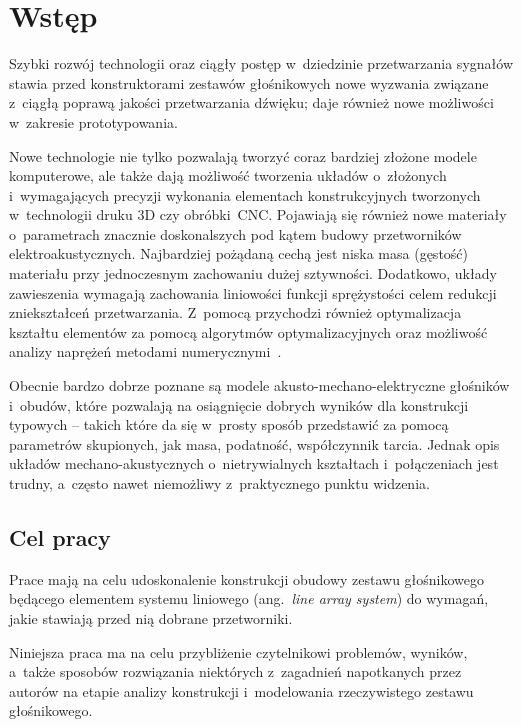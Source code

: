 \documentclass[12pt]{oska}
\affiliation{Akademia Górniczo-Hutnicza im. S. Staszica w Krakowie}
\begin{document}
	
	\maketitles
	
	\section{Wstęp}
	
	Szybki rozwój technologii oraz ciągły postęp w~dziedzinie przetwarzania sygnałów stawia przed konstruktorami zestawów głośnikowych nowe wyzwania związane z~ciągłą poprawą jakości przetwarzania dźwięku; daje również nowe możliwości w~zakresie prototypowania. 
	
	Nowe technologie nie tylko pozwalają tworzyć coraz bardziej złożone modele komputerowe, ale także dają możliwość tworzenia układów o~złożonych i~wymagających precyzji wykonania elementach konstrukcyjnych tworzonych w~technologii druku 3D czy obróbki~CNC. Pojawiają się również nowe materiały o~parametrach znacznie doskonalszych pod kątem budowy przetworników elektroakustycznych. Najbardziej pożądaną cechą jest niska masa (gęstość) materiału przy jednoczesnym zachowaniu dużej sztywności. Dodatkowo, układy zawieszenia wymagają zachowania liniowości funkcji sprężystości celem redukcji zniekształceń przetwarzania. Z~pomocą przychodzi również optymalizacja kształtu elementów za pomocą algorytmów optymalizacyjnych oraz możliwość analizy naprężeń metodami numerycznymi~\cite{naprezenia}.
	
	Obecnie bardzo dobrze poznane są modele akusto-mechano-elektryczne głośników i~obudów, które pozwalają na osiągnięcie dobrych wyników dla konstrukcji typowych -- takich które da się w~prosty sposób przedstawić za pomocą parametrów skupionych, jak masa, podatność, współczynnik tarcia. Jednak opis układów mechano-akustycznych o~nietrywialnych kształtach i~połączeniach jest trudny, a~często nawet niemożliwy z~praktycznego punktu widzenia.
	
	\subsection{Cel pracy}
	
	Prace mają na celu udoskonalenie konstrukcji obudowy zestawu głośnikowego będącego elementem systemu liniowego (ang.~\textit{line array system}) do wymagań, jakie stawiają przed nią dobrane przetworniki.
	
	Niniejsza praca ma na celu przybliżenie czytelnikowi problemów, wyników, a~także sposobów rozwiązania niektórych z~zagadnień napotkanych przez autorów na etapie analizy konstrukcji i~modelowania rzeczywistego zestawu głośnikowego.
	
\end{document}
